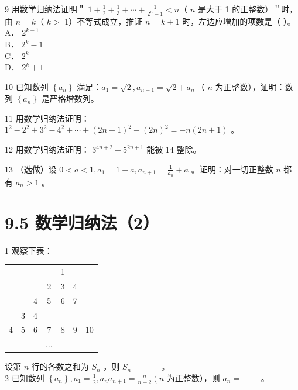 \documentclass[10pt]{article}
\begin{document}
9 用数学归纳法证明＂ \(1+\frac{1}{2}+\frac{1}{3}+\cdots+\frac{1}{2^{n}-1}<n\)（ \(n\) 是大于 1 的正整数）＂时，由 \(n=k\)（ \(k>\) 1）不等式成立，推证 \(n=k+1\) 时，左边应增加的项数是（ ）。\\
A． \(2^{k-1}\)\\
B． \(2^{k}-1\)\\
C． \(2^{k}\)\\
D． \(2^{k}+1\)

10 已知数列 \(\left\{a_{n}\right\}\) 满足：\(a_{1}=\sqrt{2}, a_{n+1}=\sqrt{2+a_{n}}\)（ \(n\) 为正整数），证明：数列 \(\left\{a_{n}\right\}\) 是严格增数列。

11 用数学归纳法证明： \(1^{2}-2^{2}+3^{2}-4^{2}+\cdots+(2 n-1)^{2}-(2 n)^{2}=-n(2 n+1)\) 。

12 用数学归纳法证明： \(3^{4 n+2}+5^{2 n+1}\) 能被 14 整除。

13 （选做）设 \(0<a<1, a_{1}=1+a, a_{n+1}=\frac{1}{a_{n}}+a\) 。证明：对一切正整数 \(n\) 都有 \(a_{n}>1\) 。

\section*{9.5 数学归纳法（2）}
1 观察下表：

\begin{center}
\begin{tabular}{ccccccc}
 &  &  &  & 1 &  &  \\
 &  &  & 2 & 3 & 4 &  \\
 &  & 4 & 5 & 6 & 7 &  \\
 & 3 & 4 &  &  &  &  \\
4 & 5 & 6 & 7 & 8 & 9 & 10 \\
 &  &  & \(\ldots\) &  &  &  \\
\end{tabular}
\end{center}

设第 \(n\) 行的各数之和为 \(S_{n}\) ，则 \(S_{n}=\) \(\qquad\)。\\
2 已知数列 \(\left\{a_{n}\right\}, a_{1}=\frac{1}{2}, a_{n} a_{n+1}=\frac{n}{n+2}\left(n\right.\) 为正整数），则 \(a_{n}=\) \(\qquad\)。
\end{document}
